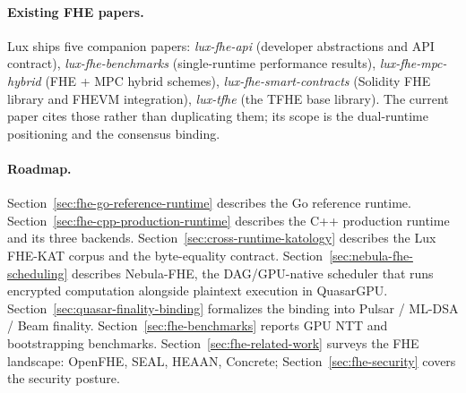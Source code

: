 \paragraph{Existing FHE papers.}
Lux ships five companion papers: \emph{lux-fhe-api} (developer
abstractions and API contract), \emph{lux-fhe-benchmarks} (single-runtime
performance results), \emph{lux-fhe-mpc-hybrid} (FHE + MPC hybrid
schemes), \emph{lux-fhe-smart-contracts} (Solidity FHE library and FHEVM
integration), \emph{lux-tfhe} (the TFHE base library). The current paper
cites those rather than duplicating them; its scope is the dual-runtime
positioning and the consensus binding.

\paragraph{Roadmap.}
Section~\ref{sec:fhe-go-reference-runtime} describes the Go reference
runtime. Section~\ref{sec:fhe-cpp-production-runtime} describes the C++
production runtime and its three backends. Section~\ref{sec:cross-runtime-katology}
describes the Lux FHE-KAT corpus and the byte-equality contract.
Section~\ref{sec:nebula-fhe-scheduling} describes Nebula-FHE, the
DAG/GPU-native scheduler that runs encrypted computation alongside
plaintext execution in QuasarGPU. Section~\ref{sec:quasar-finality-binding}
formalizes the binding into Pulsar / ML-DSA / Beam finality.
Section~\ref{sec:fhe-benchmarks} reports GPU NTT and bootstrapping
benchmarks. Section~\ref{sec:fhe-related-work} surveys the FHE
landscape: OpenFHE, SEAL, HEAAN, Concrete; Section~\ref{sec:fhe-security}
covers the security posture.
